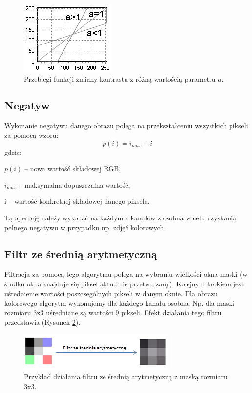 \documentclass{classrep}
\begin{document}
\begin{figure}[h!]
\centering
\includegraphics{obrazy/kontrast.png} 
\caption[Zmiana kontrastu]{Przebiegi funkcji zmiany kontrastu z różną wartością parametru $a$.}
\label{fig:kontrast}
\end{figure}

\subsection{Negatyw}
Wykonanie negatywu danego obrazu polega na przekształceniu wszystkich pikseli za pomocą wzoru:
\begin{equation}
 p(i) = i_{max} - i
\end{equation}
gdzie:
\begin{description}
\item $p(i)$ -- nowa wartość składowej RGB,
\item $i_{max}$ -- maksymalna dopuszczalna wartość,
\item i -- wartość konkretnej składowej danego piksela.
\end{description}

Tą operację należy wykonać na każdym z kanałów z osobna w celu uzyskania pełnego negatywu w przypadku np. zdjęć kolorowych.

\subsection{Filtr ze średnią arytmetyczną}

Filtracja za pomocą tego algorytmu polega na wybraniu wielkości okna maski (w środku okna znajduje się piksel aktualnie przetwarzany). Kolejnym krokiem jest uśrednienie wartości poszczególnych pikseli w danym oknie. Dla obrazu kolorowego algorytm wykonujemy dla każdego kanału osobna. Np. dla maski rozmiaru 3x3 uśredniane są wartości 9 pikseli. Efekt działania tego filtru przedstawia (Rysunek \ref{fig:meanFilter}).
\begin{figure}[h!]
\centering
\includegraphics[width=7.83cm]{obrazy/meanFilter.png} 
\caption[Filtr ze średnią arytmetyczną]{Przykład działania filtru ze średnią arytmetyczną z maską rozmiaru 3x3.}
\label{fig:meanFilter}
\end{figure}
\end{document}
